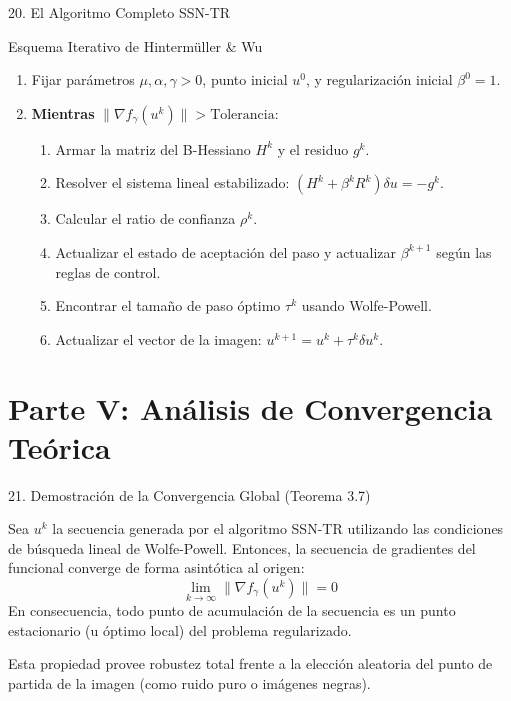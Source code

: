 \documentclass[aspectratio=169,11pt]{beamer}
\begin{document}
\begin{frame}{20. El Algoritmo Completo SSN-TR}
    \begin{block}{Esquema Iterativo de Hintermüller \& Wu}
        \begin{enumerate}
            \item Fijar parámetros $\mu, \alpha, \gamma > 0$, punto inicial $u^0$, y regularización inicial $\beta^0 = 1$.
            \item \textbf{Mientras} $\|\nabla f_\gamma(u^k)\| > \text{Tolerancia}$:
            \begin{enumerate}
                \item Armar la matriz del B-Hessiano $H^k$ y el residuo $g^k$.
                \item Resolver el sistema lineal estabilizado: $(H^k + \beta^k R^k)\delta u = -g^k$.
                \item Calcular el ratio de confianza $\rho^k$.
                \item Actualizar el estado de aceptación del paso y actualizar $\beta^{k+1}$ según las reglas de control.
                \item Encontrar el tamaño de paso óptimo $\tau^k$ usando Wolfe-Powell.
                \item Actualizar el vector de la imagen: $u^{k+1} = u^k + \tau^k \delta u^k$.
            \end{enumerate}
        \end{enumerate}
    \end{block}
\end{frame}

\section{Parte V: Análisis de Convergencia Teórica}

\begin{frame}{21. Demostración de la Convergencia Global (Teorema 3.7)}
    \begin{theorem}
        Sea $u^k$ la secuencia generada por el algoritmo SSN-TR utilizando las condiciones de búsqueda lineal de Wolfe-Powell. Entonces, la secuencia de gradientes del funcional converge de forma asintótica al origen:
        \begin{equation}
            \lim_{k \to \infty} \| \nabla f_\gamma(u^k) \| = 0
        \end{equation}
        En consecuencia, todo punto de acumulación de la secuencia es un punto estacionario (u óptimo local) del problema regularizado.
    \end{theorem}
    Esta propiedad provee robustez total frente a la elección aleatoria del punto de partida de la imagen (como ruido puro o imágenes negras).
\end{frame}
\end{document}
